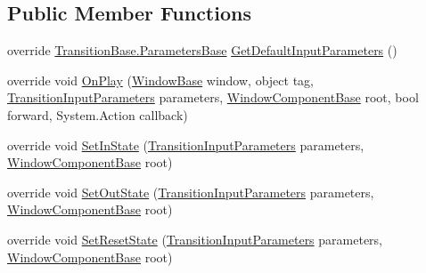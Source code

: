 \subsection*{Public Member Functions}
\begin{DoxyCompactItemize}
\item 
override \hyperlink{class_unity_engine_1_1_u_i_1_1_windows_1_1_animations_1_1_transition_base_1_1_parameters_base}{Transition\+Base.\+Parameters\+Base} \hyperlink{class_unity_engine_1_1_u_i_1_1_windows_1_1_animations_1_1_window_animation_transition_slide_a14da7df5ba6d9cce772258c664bfe5f6}{Get\+Default\+Input\+Parameters} ()
\item 
override void \hyperlink{class_unity_engine_1_1_u_i_1_1_windows_1_1_animations_1_1_window_animation_transition_slide_aebac9729574e1545ce6cfe59266b35af}{On\+Play} (\hyperlink{class_unity_engine_1_1_u_i_1_1_windows_1_1_window_base}{Window\+Base} window, object tag, \hyperlink{class_unity_engine_1_1_u_i_1_1_windows_1_1_animations_1_1_transition_input_parameters}{Transition\+Input\+Parameters} parameters, \hyperlink{class_unity_engine_1_1_u_i_1_1_windows_1_1_window_component_base}{Window\+Component\+Base} root, bool forward, System.\+Action callback)
\item 
override void \hyperlink{class_unity_engine_1_1_u_i_1_1_windows_1_1_animations_1_1_window_animation_transition_slide_a6053abdc00518ee455d3c92fcef0ecfe}{Set\+In\+State} (\hyperlink{class_unity_engine_1_1_u_i_1_1_windows_1_1_animations_1_1_transition_input_parameters}{Transition\+Input\+Parameters} parameters, \hyperlink{class_unity_engine_1_1_u_i_1_1_windows_1_1_window_component_base}{Window\+Component\+Base} root)
\item 
override void \hyperlink{class_unity_engine_1_1_u_i_1_1_windows_1_1_animations_1_1_window_animation_transition_slide_a3be82264eab555295cfb59c6578045c0}{Set\+Out\+State} (\hyperlink{class_unity_engine_1_1_u_i_1_1_windows_1_1_animations_1_1_transition_input_parameters}{Transition\+Input\+Parameters} parameters, \hyperlink{class_unity_engine_1_1_u_i_1_1_windows_1_1_window_component_base}{Window\+Component\+Base} root)
\item 
override void \hyperlink{class_unity_engine_1_1_u_i_1_1_windows_1_1_animations_1_1_window_animation_transition_slide_a014cb6693e883fb695a749fea75bc1cf}{Set\+Reset\+State} (\hyperlink{class_unity_engine_1_1_u_i_1_1_windows_1_1_animations_1_1_transition_input_parameters}{Transition\+Input\+Parameters} parameters, \hyperlink{class_unity_engine_1_1_u_i_1_1_windows_1_1_window_component_base}{Window\+Component\+Base} root)
\end{DoxyCompactItemize}
